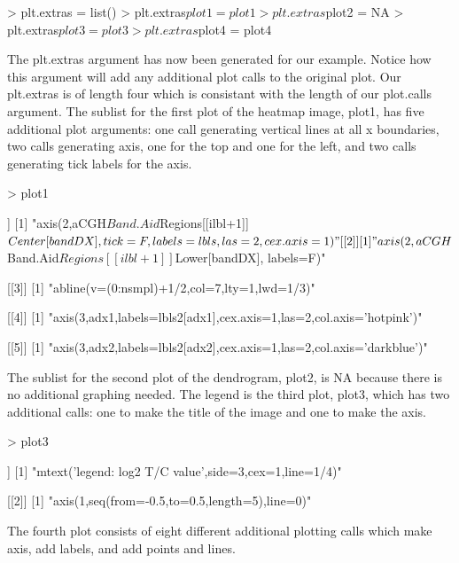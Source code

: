 \documentclass[]{article}
\begin{document}
\begin{Schunk}
\begin{Sinput}
> plt.extras = list()
> plt.extras$plot1 = plot1
> plt.extras$plot2 = NA
> plt.extras$plot3 = plot3
> plt.extras$plot4 = plot4
\end{Sinput}
\end{Schunk}
\quad The plt.extras argument has now been generated for our example. Notice how this argument will add any additional plot calls to the original plot. Our plt.extras is of length four which is consistant with the length of our plot.calls argument. The sublist for the first plot of the heatmap image, plot1, has five additional plot arguments: one call generating vertical lines at all x boundaries, two calls generating axis, one for the top and one for the left, and two calls generating tick labels for the axis.
\begin{Schunk}
\begin{Sinput}
> plot1
\end{Sinput}
\begin{Soutput}
[[1]]
[1] "axis(2,aCGH$Band.Aid$Regions[[ilbl+1]]$Center[bandDX],tick=F,labels=lbls,las=2,cex.axis=1)"

[[2]]
[1] "axis(2,aCGH$Band.Aid$Regions[[ilbl+1]]$Lower[bandDX], labels=F)"

[[3]]
[1] "abline(v=(0:nsmpl)+1/2,col=7,lty=1,lwd=1/3)"

[[4]]
[1] "axis(3,adx1,labels=lbls2[adx1],cex.axis=1,las=2,col.axis='hotpink')"

[[5]]
[1] "axis(3,adx2,labels=lbls2[adx2],cex.axis=1,las=2,col.axis='darkblue')"
\end{Soutput}
\end{Schunk}
 The sublist for the second plot of the dendrogram, plot2, is NA because there is no additional graphing needed. The legend is the third plot, plot3, which has two additional calls: one to make the title of the image and one to make the axis. 
\begin{Schunk}
\begin{Sinput}
> plot3
\end{Sinput}
\begin{Soutput}
[[1]]
[1] "mtext('legend: log2 T/C value',side=3,cex=1,line=1/4)"

[[2]]
[1] "axis(1,seq(from=-0.5,to=0.5,length=5),line=0)"
\end{Soutput}
\end{Schunk}
The fourth plot consists of eight different additional plotting calls which make axis, add labels, and add points and lines.   
\end{document}
